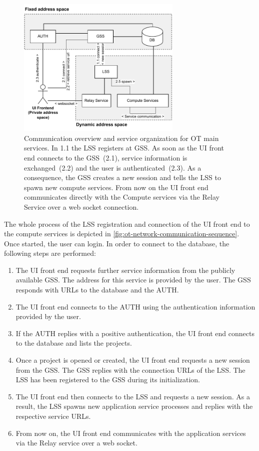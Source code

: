 \begin{figure}[h]
	\centering
	\includegraphics[width=0.7\textwidth]{Figures/opentwin-network-communication-diagram.pdf}
	\caption{Communication overview and service organization for \ac{OT} main services. In 1.1 the \ac{LSS} registers at \ac{GSS}. As soon as the \ac{UI} front end connects to the \ac{GSS}~(2.1), service information is exchanged~(2.2) and the user is authenticated~(2.3). As a consequence, the \ac{GSS} creates a new session and tells the \ac{LSS} to spawn new compute services. From now on the \ac{UI} front end communicates directly with the Compute services via the Relay Service over a web socket connection.}
	\label{fig:ot-network-communication-diagram}
\end{figure}


The whole process of the \ac{LSS} registration and connection of the \ac{UI} front end to the compute services is depicted in \autoref{fig:ot-network-communication-sequence}.
Once started, the user can login. In order to connect to the database, the following steps are performed:
\begin{enumerate}
\item The \ac{UI} front end requests further service information from the publicly available \ac{GSS}. The address for this service is provided by the user. The \ac{GSS} responds with \acp{URL} to the database and the \ac{AUTH}.
\item The \ac{UI} front end connects to the \ac{AUTH} using the authentication information provided by the user.
\item If the \ac{AUTH} replies with a positive authentication, the \ac{UI} front end connects to the database and lists the projects.
\item Once a project is opened or created, the \ac{UI} front end requests a new session from the \ac{GSS}. The \ac{GSS} replies with the connection \acp{URL} of the \ac{LSS}. The \ac{LSS} has been registered to the \ac{GSS} during its initialization.
\item The \ac{UI} front end then connects to the \ac{LSS} and requests a new session. As a result, the \ac{LSS} spawns new application service processes and replies with the respective service \acp{URL}.
\item From now on, the \ac{UI} front end communicates with the application services via the Relay service over a web socket.
\end{enumerate}

